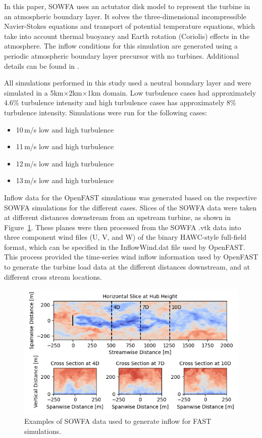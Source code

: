 \documentclass[11pt,letterpaper]{article}
\begin{document}
In this paper, SOWFA uses an actutator disk model to represent the turbine in an atmospheric boundary layer.  It solves the three-dimensional incompressible Navier-Stokes equations and transport of potential temperature equations, which take into account thermal buoyancy and Earth rotation (Coriolis) effects in the atmosphere.  The inflow conditions for this simulation are generated using a periodic atmospheric boundary layer precursor with no turbines.  Additional details can be found in \cite{fleming2013sowfa}. 

All simulations performed in this study used a neutral boundary layer and were simulated in a 5km$\times$2km$\times$1km domain.  Low turbulence cases had approximately 4.6$\%$ turbulence intensity and high turbulence cases has approximately 8$\%$ turbulence intensity.  Simulations were run for the following cases:
\begin{itemize}
    \item 10\,m/s low and high turbulence
    \item 11\,m/s low and high turbulence
    \item 12\,m/s low and high turbulence
    \item 13\,m/s low and high turbulence
\end{itemize}

Inflow data for the OpenFAST simulations was generated based on the respective SOWFA simulations for the different cases. Slices of the SOWFA data were taken at different distances downstream from an upstream turbine, as shown in Figure~\ref{fig:sowfa_slices_for_FAST_input}. These planes were then processed from the SOWFA .vtk data into three component wind files (U, V, and W) of the binary HAWC-style full-field format, which can be specified in the InflowWind.dat file used by OpenFAST. This process provided the time-series wind inflow information used by OpenFAST to generate the turbine load data at the different distances downstream, and at different cross stream locations.

\begin{figure}
    \centering
    \includegraphics{images/sowfa_slices.png}
    \caption{Examples of SOWFA data used to generate inflow for FAST simulations.}
    \label{fig:sowfa_slices_for_FAST_input}
\end{figure}
\end{document}
